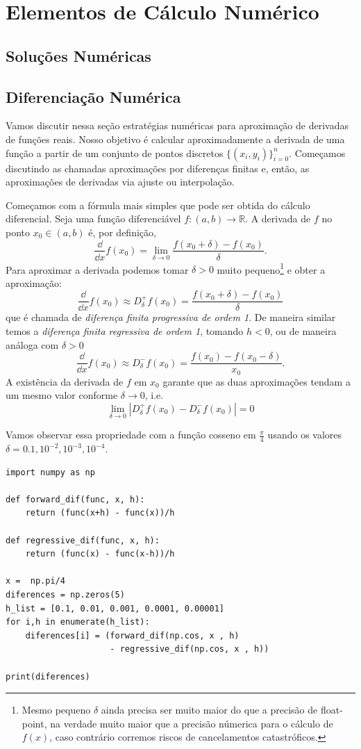 \chapter{Elementos de Cálculo Numérico}
\section{Soluções Numéricas}
\section{Diferenciação Numérica}

Vamos discutir nessa seção estratégias numéricas para aproximação de derivadas de funções reais. Nosso objetivo é calcular aproximadamente a derivada de uma função a partir de um conjunto de pontos discretos $\{(x_i,y_i)\}_{i=0}^n$. Começamos discutindo as chamadas aproximações por diferenças finitas e, então, as aproximações de derivadas via ajuste ou interpolação. 

Começamos com a fórmula mais simples que pode ser obtida do cálculo diferencial. Seja  uma função diferenciável $f: (a,b) \to \mathbb{R}$. A derivada de $f$  no ponto $x_0 \in (a,b)$  é, por definição,
\[ \frac{\dd }{\dd x} f(x_0) = \lim_{\delta \to 0} \frac{f(x_0+\delta) - f(x_0)}{\delta}.\]
Para aproximar a derivada podemos tomar $\delta > 0$ muito pequeno\footnote{Mesmo pequeno  $\delta$ ainda precisa ser muito maior do que a precisão de float-point, na verdade muito maior que a precisão númerica para o cálculo de $f(x)$, caso contrário corremos riscos de cancelamentos catastróficos.} e obter a aproximação:
\[\frac{\dd }{\dd x} f(x_0) \approx D^+_\delta f (x_0) = \frac{f(x_0+\delta) - f(x_0)}{\delta}  \]
que é chamada de {\it diferença finita progressiva de ordem 1}. De maneira similar temos a {\it diferença finita regressiva de ordem 1}, tomando $h<0$, ou de maneira análoga com $\delta>0$
\[\frac{\dd }{\dd x} f(x_0) \approx D^-_\delta f (x_0) = \frac{f(x_0) - f(x_0 - \delta)}{x_0}. \]
A existência da derivada de $f$ em $x_0$ garante que as duas aproximações tendam a um mesmo valor conforme $\delta \to 0$, i.e. 
\[ \lim_{\delta \to 0} |D_\delta^+ f(x_0) - D_\delta^- f(x_0) |= 0 \]

Vamos observar essa propriedade com a função cosseno em $\frac{\pi}{4}$ usando os valores
$\delta = 0.1, 10^{-2}, 10^{-3}, 10^{-4}$. 

\begin{lstlisting}
import numpy as np

def forward_dif(func, x, h):
    return (func(x+h) - func(x))/h

def regressive_dif(func, x, h):
    return (func(x) - func(x-h))/h

x =  np.pi/4
diferences = np.zeros(5)
h_list = [0.1, 0.01, 0.001, 0.0001, 0.00001]
for i,h in enumerate(h_list):
    diferences[i] = (forward_dif(np.cos, x , h)
                     - regressive_dif(np.cos, x , h))

print(diferences)
\end{lstlisting}

